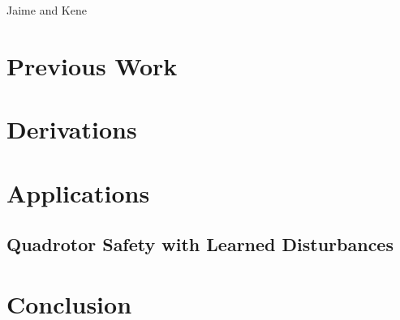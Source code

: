 \documentclass[a4paper]{article}
\begin{document}
Jaime and Kene

\section{Previous Work}

\section{Derivations}

\section{Applications}
\subsection{Quadrotor Safety with Learned Disturbances}

\section{Conclusion}
\end{document}
